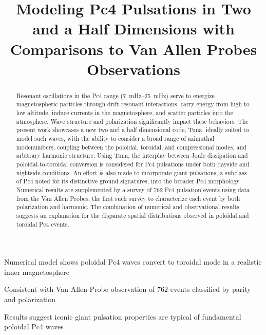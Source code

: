 \documentclass[draft,linenumbers]{agujournal}
\begin{document}

\title{Modeling Pc4 Pulsations in Two and a Half Dimensions with Comparisons to Van Allen Probes Observations}




\begin{keypoints}
\item Numerical model shows poloidal Pc4 waves convert to toroidal mode in a realistic inner magnetosphere
\item Consistent with Van Allen Probe observation of 762 events classified by parity and polarization
\item Results suggest iconic giant pulsation properties are typical of fundamental poloidal Pc4 waves
\end{keypoints}


\begin{abstract}
Resonant oscillations in the Pc4 range (\SIrange{7}{25}{\mHz}) serve to energize magnetospheric particles through drift-resonant interactions, carry energy from high to low altitude, induce currents in the magnetosphere, and scatter particles into the atmosphere. Wave structure and polarization significantly impact these behaviors. The present work showcases a new two and a half dimensional code, Tuna, ideally suited to model such waves, with the ability to consider a broad range of azimuthal modenumbers, coupling between the poloidal, toroidal, and compressional modes, and arbitrary harmonic structure. Using Tuna, the interplay between Joule dissipation and poloidal-to-toroidal conversion is considered for Pc4 pulsations under both dayside and nightside conditions. An effort is also made to incorporate giant pulsations, a subclass of Pc4 noted for its distinctive ground signatures, into the broader Pc4 morphology. Numerical results are supplemented by a survey of 762 Pc4 pulsation events using data from the Van Allen Probes, the first such survey to characterize each event by both polarization and harmonic. The combination of numerical and observational results suggests an explanation for the disparate spatial distributions observed in poloidal and toroidal Pc4 events.
\end{abstract}
\end{document}
